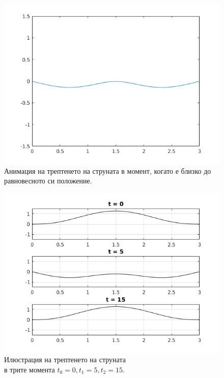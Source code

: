 \documentclass[14pt]{extarticle}
\begin{document}
\begin{figure}[H]
	\captionsetup{justification=centering,margin=2cm}
	\centering
	\includegraphics[scale=0.8]{images/task21mid}
	\caption{Анимация на трептенето на струната в момент, когато е близко до равновесното си положение.}
\end{figure}

\begin{figure}[H]
	\captionsetup{justification=centering,margin=2cm}
	\centering
	\includegraphics{images/task22moments}
	\caption{Илюстрация на трептенето на струната\\в трите момента $t_0 = 0, t_1 = 5, t_2 = 15$.}
\end{figure}
\end{document}
